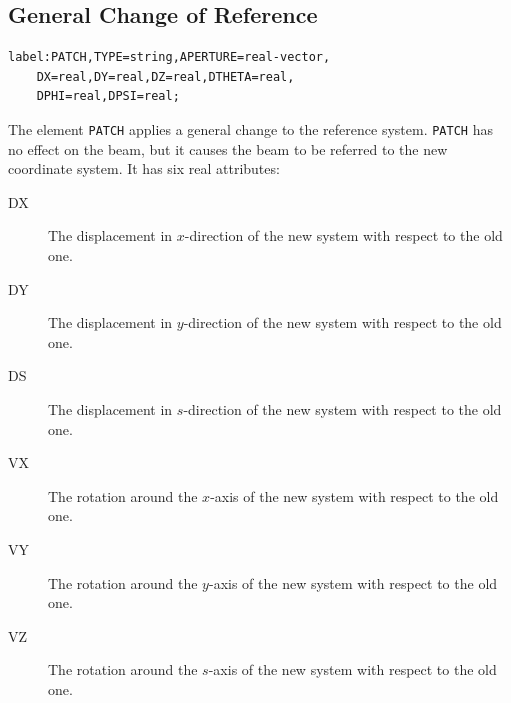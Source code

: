 \subsection{General Change of Reference}
\label{sec:patch}
\begin{verbatim}
label:PATCH,TYPE=string,APERTURE=real-vector,
	DX=real,DY=real,DZ=real,DTHETA=real,
	DPHI=real,DPSI=real;
\end{verbatim}
The element \texttt{PATCH} applies a general change to the reference system. 
\texttt{PATCH} has no effect on the beam,
but it causes the beam to be referred to the new coordinate system.
It has six real attributes:
\begin{description}
\item[DX]
  The displacement in $x$-direction of the new system with respect to the old
  one. 
\item[DY]
  The displacement in $y$-direction of the new system with respect to the old
  one. 
\item[DS]
  The displacement in $s$-direction of the new system with respect to the old
  one. 
\item[VX]
  The rotation around the $x$-axis of the new system with respect to the old
  one. 
\item[VY]
  The rotation around the $y$-axis of the new system with respect to the old
  one. 
\item[VZ]
  The rotation around the $s$-axis of the new system with respect to the old
  one. 
\end{description}

